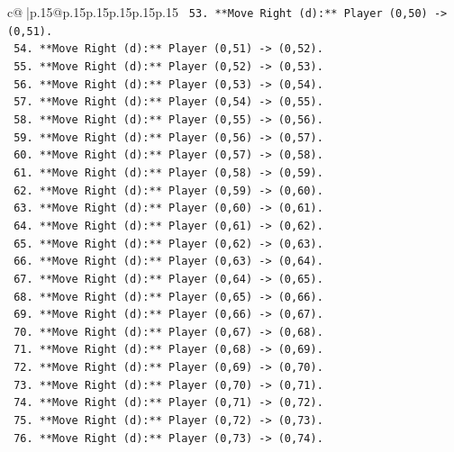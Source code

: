 \documentclass{article}
\begin{document}
{\begin{supertabular}{c@{$\;$}|p{.15\linewidth}@{}p{.15\linewidth}p{.15\linewidth}p{.15\linewidth}p{.15\linewidth}p{.15\linewidth}}
{{{\texttt{        53. **Move Right (d):** Player (0,50) {-}> (0,51).} \\
\texttt{        54. **Move Right (d):** Player (0,51) {-}> (0,52).} \\
\texttt{        55. **Move Right (d):** Player (0,52) {-}> (0,53).} \\
\texttt{        56. **Move Right (d):** Player (0,53) {-}> (0,54).} \\
\texttt{        57. **Move Right (d):** Player (0,54) {-}> (0,55).} \\
\texttt{        58. **Move Right (d):** Player (0,55) {-}> (0,56).} \\
\texttt{        59. **Move Right (d):** Player (0,56) {-}> (0,57).} \\
\texttt{        60. **Move Right (d):** Player (0,57) {-}> (0,58).} \\
\texttt{        61. **Move Right (d):** Player (0,58) {-}> (0,59).} \\
\texttt{        62. **Move Right (d):** Player (0,59) {-}> (0,60).} \\
\texttt{        63. **Move Right (d):** Player (0,60) {-}> (0,61).} \\
\texttt{        64. **Move Right (d):** Player (0,61) {-}> (0,62).} \\
\texttt{        65. **Move Right (d):** Player (0,62) {-}> (0,63).} \\
\texttt{        66. **Move Right (d):** Player (0,63) {-}> (0,64).} \\
\texttt{        67. **Move Right (d):** Player (0,64) {-}> (0,65).} \\
\texttt{        68. **Move Right (d):** Player (0,65) {-}> (0,66).} \\
\texttt{        69. **Move Right (d):** Player (0,66) {-}> (0,67).} \\
\texttt{        70. **Move Right (d):** Player (0,67) {-}> (0,68).} \\
\texttt{        71. **Move Right (d):** Player (0,68) {-}> (0,69).} \\
\texttt{        72. **Move Right (d):** Player (0,69) {-}> (0,70).} \\
\texttt{        73. **Move Right (d):** Player (0,70) {-}> (0,71).} \\
\texttt{        74. **Move Right (d):** Player (0,71) {-}> (0,72).} \\
\texttt{        75. **Move Right (d):** Player (0,72) {-}> (0,73).} \\
\texttt{        76. **Move Right (d):** Player (0,73) {-}> (0,74).} \\
}}}
\end{supertabular}}
\end{document}
